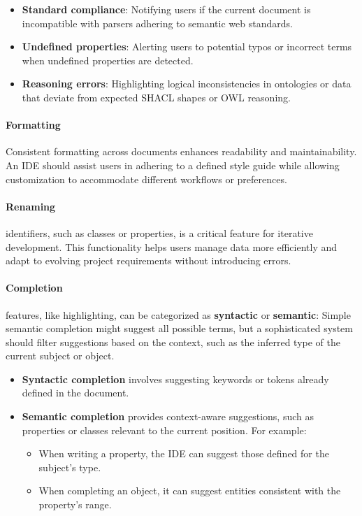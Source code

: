 \begin{itemize}
    \item \textbf{Standard compliance}: Notifying users if the current document is incompatible with parsers adhering to semantic web standards.
    \item \textbf{Undefined properties}: Alerting users to potential typos or incorrect terms when undefined properties are detected.
    \item \textbf{Reasoning errors}: Highlighting logical inconsistencies in ontologies or data that deviate from expected SHACL shapes or OWL reasoning.
\end{itemize}


\paragraph*{Formatting} 
Consistent formatting across documents enhances readability and maintainability.
An IDE should assist users in adhering to a defined style guide while allowing customization to accommodate different workflows or preferences.

\paragraph*{Renaming} identifiers, such as classes or properties, is a critical feature for iterative development.
This functionality helps users manage data more efficiently and adapt to evolving project requirements without introducing errors.

\paragraph*{Completion} features, like highlighting, can be categorized as \textbf{syntactic} or \textbf{semantic}:
Simple semantic completion might suggest all possible terms, but a sophisticated system should filter suggestions based on the context, such as the inferred type of the current subject or object.

\begin{itemize}
    \item \textbf{Syntactic completion} involves suggesting keywords or tokens already defined in the document.
    \item \textbf{Semantic completion} provides context-aware suggestions, such as properties or classes relevant to the current position. For example:
    \begin{itemize}
        \item When writing a property, the IDE can suggest those defined for the subject's type.
        \item When completing an object, it can suggest entities consistent with the property's range.
    \end{itemize}
\end{itemize}

